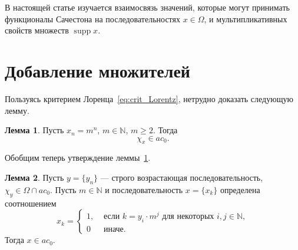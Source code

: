 \documentclass[a4paper,openbib]{article}
\renewcommand{\geq}{\geqslant} %
\DeclareMathOperator{\supp}{supp}
\theoremstyle{definition}
\newtheorem{lemma}{Лемма}[section]
\begin{document}
В настоящей статье изучается взаимосвязь значений, которые могут принимать функционалы Сачестона
на последовательностях $x\in \Omega$, и мультипликативных свойств множеств $\supp x$.





\section{Добавление множителей}

Пользуясь критерием Лоренца~\eqref{eq:crit_Lorentz},
нетрудно доказать следующую лемму.

\begin{lemma}
	\label{lem:simple_powers_in_ac0}
	Пусть $x_n = m^n$, $m\in\mathbb{N}$, $m\geq 2$.
	Тогда
	\begin{equation}
		\chi_x \in ac_0
		.
	\end{equation}
\end{lemma}

Обобщим теперь утверждение леммы~\ref{lem:simple_powers_in_ac0}.

\begin{lemma}
	Пусть $y = \{y_n\}$ --- строго возрастающая последовательность,
	$\chi_y\in\Omega \cap ac_0$.
	Пусть $m \in \mathbb{N}$
	и последовательность $x=\{x_k\}$ определена соотношением
	\begin{equation}
		x_k = \begin{cases}
			1, &\mbox{~если~} k = y_i \cdot m^j \mbox{~для некоторых~} i,j\in\mathbb{N},
			\\
			0  &\mbox{~иначе}
			.
		\end{cases}
	\end{equation}
	Тогда $x\in ac_0$.
\end{lemma}
\end{document}
